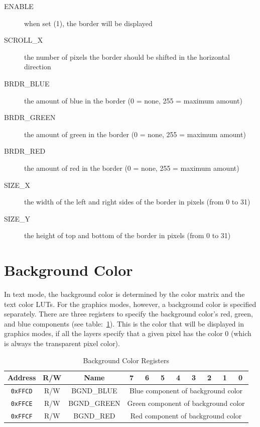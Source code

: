 \begin{description}
    \item[ENABLE] when set (1), the border will be displayed

    \item[SCROLL\_X] the number of pixels the border should be shifted in the horizontal direction

    \item[BRDR\_BLUE] the amount of blue in the border (0 = none, 255 = maximum amount)

    \item[BRDR\_GREEN] the amount of green in the border (0 = none, 255 = maximum amount)

    \item[BRDR\_RED] the amount of red in the border (0 = none, 255 = maximum amount)

    \item[SIZE\_X] the width of the left and right sides of the border in pixels (from 0 to 31)

    \item[SIZE\_Y] the height of top and bottom of the border in pixels (from 0 to 31)
\end{description}

\section*{Background Color}

In text mode, the background color is determined by the color matrix and the text color LUTs. For the graphics modes, however, a background color is specified separately. There are three registers to specify the background color's red, green, and blue components (see table:~\ref{tab:back_reg}). This is the color that will be displayed in graphics modes, if all the layers specify that a given pixel has the color 0 (which is always the transparent pixel color).

\begin{table}[ht]
    \begin{center}
        \begin{tabular}{|c|c|c|c|c|c|c|c|c|c|c|} \hline
            Address & R/W & Name & 7 & 6 & 5 & 4 & 3 & 2 & 1 & 0 \\\hline\hline
            \verb+0xFFCD+ & R/W & BGND\_BLUE & \multicolumn{8}{|c|}{Blue component of background color} \\ \hline
            \verb+0xFFCE+ & R/W & BGND\_GREEN & \multicolumn{8}{|c|}{Green component of background color} \\ \hline
            \verb+0xFFCF+ & R/W & BGND\_RED & \multicolumn{8}{|c|}{Red component of background color} \\ \hline
        \end{tabular}
    \end{center}
    \caption{Background Color Registers}
    \label{tab:back_reg}
\end{table}

